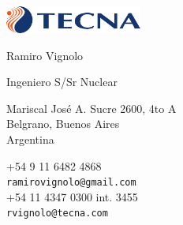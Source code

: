 \documentclass{article}
\begin{document}
\AddToShipoutPicture{\BackgroundPic}


\vspace{0.5cm plus \chico minus \chico}

\begin{minipage}{0.3\linewidth}
\par\vspace{\chico}
\par\vspace{\chico}
\par\vspace{\chico}
\vspace{1cm}
\end{minipage}
\begin{minipage}{0.4\linewidth}

\begin{center}
\href{http://www.tecna.com}{\includegraphics[width=4.5cm]{logos/logo-tecna}}\\

\smallskip

\textsf{Ramiro Vignolo}
\par
\textsf{Ingeniero S/Sr Nuclear}
\end{center}

\smallskip

\hspace{1.25cm}
\begin{minipage}{7cm}
Mariscal José A. Sucre 2600, 4to A\\
Belgrano, Buenos Aires\\
Argentina
\end{minipage}

\begin{center}
+54 9 11 6482 4868\\
\textcolor{azul}{\texttt{ramirovignolo@gmail.com}}\\

+54 11 4347 0300 int. 3455\\
\textcolor{azul}{\texttt{rvignolo@tecna.com}}

\end{center}
\end{minipage}
\end{document}
